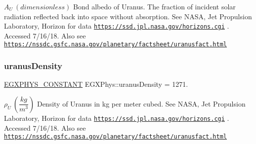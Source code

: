 $ A_{U} \ (dimensionless)$ Bond albedo of Uranus. The fraction of incident solar radiation reflected back into space without absorption. See N\+A\+SA, Jet Propulsion Laboratory, Horizon for data \href{https://ssd.jpl.nasa.gov/horizons.cgi}{\tt https\+://ssd.\+jpl.\+nasa.\+gov/horizons.\+cgi} . Accessed 7/16/18. Also see \href{https://nssdc.gsfc.nasa.gov/planetary/factsheet/uranusfact.html}{\tt https\+://nssdc.\+gsfc.\+nasa.\+gov/planetary/factsheet/uranusfact.\+html} \mbox{\label{group___e_g_x_phys-_constants-_astrophysics-_solar_system-_uranus-_bulk_gaffdc8522dc72ce6a2c81fbae2720794f}} 
\subsubsection{\texorpdfstring{uranus\+Density}{uranusDensity}}
{\footnotesize\ttfamily \mbox{\hyperlink{group___e_g_x_phys-_constants-_macros_ga76980d288494ce1714c9ac68a95ba702}{E\+G\+X\+P\+H\+Y\+S\+\_\+\+C\+O\+N\+S\+T\+A\+NT}} E\+G\+X\+Phys\+::uranus\+Density = 1271.}

$\rho_{U} \ (\dfrac{kg}{m^3})$ Density of Uranus in kg per meter cubed. See N\+A\+SA, Jet Propulsion Laboratory, Horizon for data \href{https://ssd.jpl.nasa.gov/horizons.cgi}{\tt https\+://ssd.\+jpl.\+nasa.\+gov/horizons.\+cgi} . Accessed 7/16/18. Also see \href{https://nssdc.gsfc.nasa.gov/planetary/factsheet/uranusfact.html}{\tt https\+://nssdc.\+gsfc.\+nasa.\+gov/planetary/factsheet/uranusfact.\+html} \mbox{\label{group___e_g_x_phys-_constants-_astrophysics-_solar_system-_uranus-_bulk_gae10777496d6d1804e98530f68dcbe150}} 
